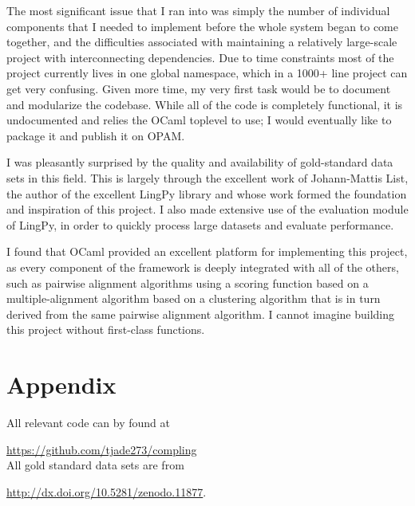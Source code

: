 \documentclass[doc,natbib,12pt]{apa6}
\begin{document}
The most significant issue that I ran into was simply the number of individual components that I needed to implement before the whole system began to come together, and the difficulties associated with maintaining a relatively large-scale project with interconnecting dependencies. Due to time constraints most of the project currently lives in one global namespace, which in a 1000+ line project can get very confusing. Given more time, my very first task would be to document and modularize the codebase. While all of the code is completely functional, it is undocumented and relies the OCaml toplevel to use; I would eventually like to package it and publish it on OPAM. 

I was pleasantly surprised by the quality and availability of gold-standard data sets in this field. This is largely through the excellent work of Johann-Mattis List, the author of the excellent LingPy library and whose work formed the foundation and inspiration of this project. I also made extensive use of the evaluation module of LingPy, in order to quickly process large datasets and evaluate performance.

I found that OCaml provided an excellent platform for implementing this project, as every component of the framework is deeply integrated with all of the others, such as pairwise alignment algorithms using a scoring function based on a multiple-alignment algorithm based on a clustering algorithm that is in turn derived from the same pairwise alignment algorithm. I cannot imagine building this project without first-class functions. 

\section{Appendix}

All relevant code can by found at 

\url{https://github.com/tjade273/compling}\\

All gold standard data sets are from 

\url{http://dx.doi.org/10.5281/zenodo.11877}.

\newpage
\begin{small} %
	\singlespacing %
	\thispagestyle{empty} %
\end{small} %
\end{document}

